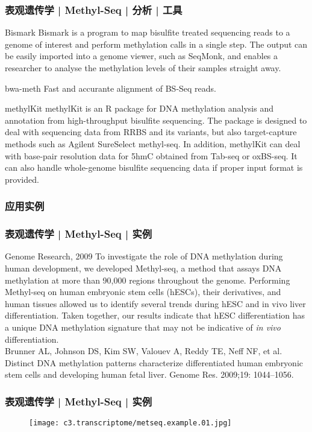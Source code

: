 \begin{frame}
  \frametitle{表观遗传学 | Methyl-Seq | 分析 | 工具}
  {\footnotesize
  \begin{block}{Bismark}
    Bismark is a program to map bisulfite treated sequencing reads to a genome of interest and perform methylation calls in a single step. The output can be easily imported into a genome viewer, such as SeqMonk, and enables a researcher to analyse the methylation levels of their samples straight away.
  \end{block}
  \pause
  \begin{block}{bwa-meth}
  Fast and accurante alignment of BS-Seq reads.
  \end{block}
  \pause
  \begin{block}{methylKit}
    methylKit is an R package for DNA methylation analysis and annotation from high-throughput bisulfite sequencing. The package is designed to deal with sequencing data from RRBS and its variants, but also target-capture methods such as Agilent SureSelect methyl-seq. In addition, methylKit can deal with base-pair resolution data for 5hmC obtained from Tab-seq or oxBS-seq. It can also handle whole-genome bisulfite sequencing data if proper input format is provided.
  \end{block}
  }
\end{frame}

\subsubsection{应用实例}
\begin{frame}
  \frametitle{表观遗传学 | Methyl-Seq | 实例}
  \begin{block}{Genome Research, 2009}
    To investigate the role of DNA methylation during human development, we developed Methyl-seq, a method that assays DNA methylation at more than 90,000 regions throughout the genome. Performing Methyl-seq on human embryonic stem cells (hESCs), their derivatives, and human tissues allowed us to identify several trends during hESC and in vivo liver differentiation. Taken together, our results indicate that hESC differentiation has a unique DNA methylation signature that may not be indicative of \textit{in vivo} differentiation.\\
    \vspace{0.5em}
    Brunner AL, Johnson DS, Kim SW, Valouev A, Reddy TE, Neff NF, et al. Distinct DNA methylation patterns characterize differentiated human embryonic stem cells and developing human fetal liver. Genome Res. 2009;19: 1044–1056.
  \end{block}
\end{frame}

\begin{frame}
  \frametitle{表观遗传学 | Methyl-Seq | 实例}
  \begin{figure}
    \centering
    \texttt{[image: c3.transcriptome/metseq.example.01.jpg]}
  \end{figure}
\end{frame}

